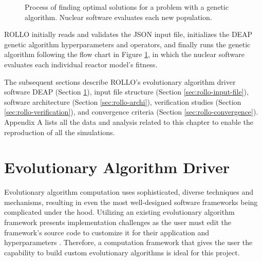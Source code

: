 \begin{figure}[htbp]
    \caption{Process of finding optimal solutions for a problem with a 
    genetic algorithm. Nuclear software evaluates each new population.}
    \label{fig:genetic_alg_nuclear}
\end{figure}
\gls{ROLLO} initially reads and validates the JSON input 
file, initializes the \gls{DEAP} \cite{fortin_deap_2012} genetic algorithm 
hyperparameters and operators, and finally runs the genetic algorithm following 
the flow chart in Figure \ref{fig:genetic_alg_nuclear}, in which the nuclear 
software evaluates each individual reactor model's fitness. 

The subsequent sections describe \gls{ROLLO}'s evolutionary algorithm driver 
software \gls{DEAP} (Section \ref{sec:rollo-ea}), input file structure (Section 
\ref{sec:rollo-input-file}), software architecture (Section \ref{sec:rollo-archi}), 
verification studies (Section \ref{sec:rollo-verification}), and convergence criteria
(Section \ref{sec:rollo-convergence}). 
Appendix A lists all the data and analysis related to this chapter to enable the 
reproduction of all the simulations.

\section{Evolutionary Algorithm Driver}
\label{sec:rollo-ea}
Evolutionary algorithm computation uses sophisticated, diverse techniques 
and mechanisms, resulting in even the most well-designed software frameworks 
being complicated under the hood. 
Utilizing an existing evolutionary algorithm framework presents implementation 
challenges as the user must edit the framework's source code to customize it for their 
application and hyperparameters \cite{fortin_deap_2012}. 
Therefore, a computation framework that gives the user the capability to build 
custom evolutionary algorithms is ideal for this project.


